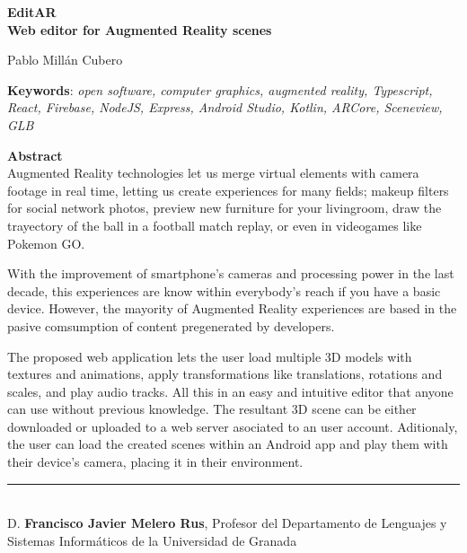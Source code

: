 \cleardoublepage

\begin{center}
	{\large\bfseries EditAR \\ Web editor for Augmented Reality scenes}\\
\end{center}
\begin{center}
	Pablo Millán Cubero\\
\end{center}
\vspace{0.5cm}
\noindent\textbf{Keywords}: \textit{open software, computer graphics, augmented reality, Typescript, React, Firebase, NodeJS, Express, Android Studio, Kotlin, ARCore, Sceneview, GLB}
\vspace{0.7cm}

\noindent\textbf{Abstract}\\
Augmented Reality technologies let us merge virtual elements with camera footage in real time, letting us create experiences for many fields; makeup filters for social network photos, preview new furniture for your livingroom, draw the trayectory of the ball in a football match replay, or even in videogames like Pokemon GO.

With the improvement of smartphone's cameras and processing power in the last decade, this experiences are know within everybody's reach if you have a basic device. However, the mayority of Augmented Reality experiences are based in the pasive comsumption of content pregenerated by developers.

The proposed web application lets the user load multiple 3D models with textures and animations, apply transformations like translations, rotations and scales, and play audio tracks. All this in an easy and intuitive editor that anyone can use without previous knowledge. The resultant 3D scene can be either downloaded or uploaded to a web server asociated to an user account. Aditionaly, the user can load the created scenes within an Android app and play them with their device's camera, placing it in their environment.


\cleardoublepage

\thispagestyle{empty}

\noindent\rule[-1ex]{\textwidth}{2pt}\\[4.5ex]

D. \textbf{Francisco Javier Melero Rus}, Profesor del Departamento de Lenguajes y Sistemas Informáticos de la Universidad de Granada

\vspace{0.5cm}

